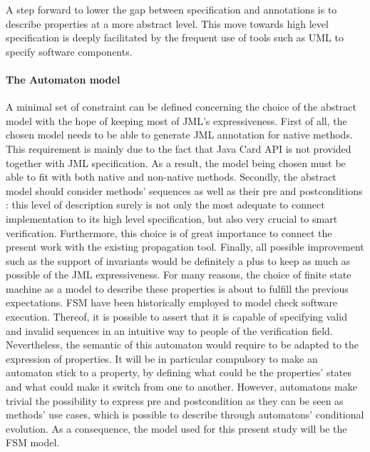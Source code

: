 A step forward to lower the gap between specification and annotations is to describe properties at a more abstract level. This move towards high level specification is deeply facilitated by the frequent use of tools such as UML to specify software components.

\paragraph{The Automaton model}
A minimal set of constraint can be defined concerning the choice of the abstract model with the hope of keeping most of JML's expressiveness. First of all, the chosen model needs to be able to generate JML annotation for native methods. This requirement is mainly due to the fact that Java Card API is not provided together with JML specification. As a result, the model being chosen must be able to fit with both native and non-native methods. Secondly, the abstract model should consider methods' sequences as well as their pre and postconditions : this level of description surely is not only the most adequate to connect implementation to its high level specification, but also very crucial to smart verification. Furthermore, this choice is of great importance to connect the present work with the existing propagation tool. Finally, all possible improvement such as the support of invariants would be definitely a plus to keep as much as possible of the JML expressiveness.
For many reasons, the choice of finite state machine as a model to describe these properties is about to fulfill the previous expectations. FSM have been historically employed to model check software execution. Thereof, it is possible to assert that it is capable of specifying valid and invalid sequences in an intuitive way to people of the verification field. Nevertheless, the semantic of this automaton would require to be adapted to the expression of properties. It will be in particular compulsory to make an automaton stick to a property, by defining what could be the properties' states and what could make it switch from one to another. However, automatons make trivial the possibility to express pre and postcondition as they can be seen as methods' use cases, which is possible to describe through automatons' conditional evolution. As a consequence, the model used for this present study will be the FSM model.

